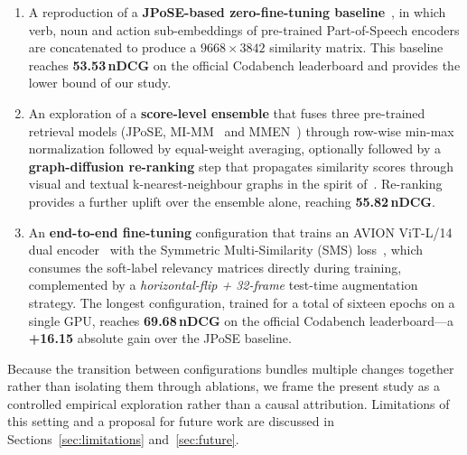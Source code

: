 \begin{enumerate}
\setlength{\itemsep}{2pt}
  \item A reproduction of a \textbf{JPoSE-based zero-fine-tuning baseline}~\cite{wray2019jpose}, in which verb, noun and action sub-embeddings of pre-trained Part-of-Speech encoders are concatenated to produce a $9668\times 3842$ similarity matrix. This baseline reaches \textbf{53.53\,nDCG} on the official Codabench leaderboard and provides the lower bound of our study.

  \item An exploration of a \textbf{score-level ensemble} that fuses three pre-trained retrieval models (JPoSE, MI-MM~\cite{miech2020milnce} and MMEN~\cite{wray2019jpose}) through row-wise min-max normalization followed by equal-weight averaging, optionally followed by a \textbf{graph-diffusion re-ranking} step that propagates similarity scores through visual and textual k-nearest-neighbour graphs in the spirit of~\cite{iscen2017diffusion}. Re-ranking provides a further uplift over the ensemble alone, reaching \textbf{55.82\,nDCG}.

  \item An \textbf{end-to-end fine-tuning} configuration that trains an AVION ViT-L/14 dual encoder~\cite{zhao2023avion} with the Symmetric Multi-Similarity (SMS) loss~\cite{wang2024symmetricmultisimilaritylossepickitchens100}, which consumes the soft-label relevancy matrices directly during training, complemented by a \emph{horizontal-flip + 32-frame} test-time augmentation strategy. The longest configuration, trained for a total of sixteen epochs on a single GPU, reaches \textbf{69.68\,nDCG} on the official Codabench leaderboard---a \textbf{+16.15} absolute gain over the JPoSE baseline.
\end{enumerate}

Because the transition between configurations bundles multiple changes together rather than isolating them through ablations, we frame the present study as a controlled empirical exploration rather than a causal attribution. Limitations of this setting and a proposal for future work are discussed in Sections~\ref{sec:limitations} and~\ref{sec:future}.
